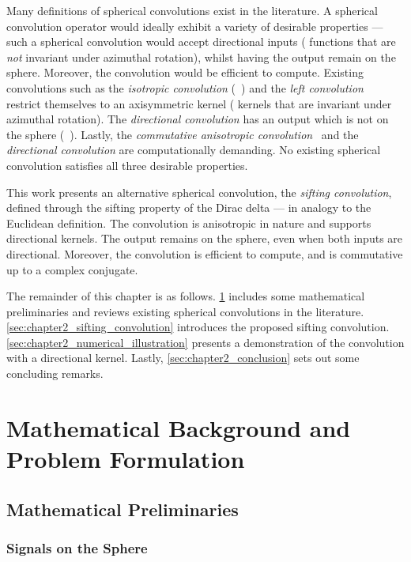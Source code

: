 Many definitions of spherical convolutions exist in the literature.
A spherical convolution operator would ideally exhibit a variety of desirable properties --- such a spherical convolution would accept directional inputs (\ie{} functions that are \emph{not} invariant under azimuthal rotation), whilst having the output remain on the sphere.
Moreover, the convolution would be efficient to compute.
Existing convolutions such as the \emph{isotropic convolution} (\eg{}~\cite{McEwen2007,Wei2011,Kennedy2011}) and the \emph{left convolution}~\cite{Kennedy2011,Driscoll1994} restrict themselves to an axisymmetric kernel (\ie{} kernels that are invariant under azimuthal rotation).
The \emph{directional convolution} has an output which is not on the sphere (\eg{}~\cite{McEwen2007,Wandelt2001}).
Lastly, the \emph{commutative anisotropic convolution}~\cite{Sadeghi2012,Khalid2012} and the \emph{directional convolution} are computationally demanding.
No existing spherical convolution satisfies all three desirable properties.

This work presents an alternative spherical convolution, the \emph{sifting convolution}, defined through the sifting property of the Dirac delta --- in analogy to the Euclidean definition.
The convolution is anisotropic in nature and supports directional kernels.
The output remains on the sphere, even when both inputs are directional.
Moreover, the convolution is efficient to compute, and is commutative up to a complex conjugate.

The remainder of this chapter is as follows.
\cref{sec:chapter2_preliminaries} includes some mathematical preliminaries and reviews existing spherical convolutions in the literature.
\cref{sec:chapter2_sifting_convolution} introduces the proposed sifting convolution.
\cref{sec:chapter2_numerical_illustration} presents a demonstration of the convolution with a directional kernel.
Lastly, \cref{sec:chapter2_conclusion} sets out some concluding remarks.

\section{Mathematical Background and Problem Formulation}\label{sec:chapter2_preliminaries}

\subsection{Mathematical Preliminaries}

\subsubsection{Signals on the Sphere}

